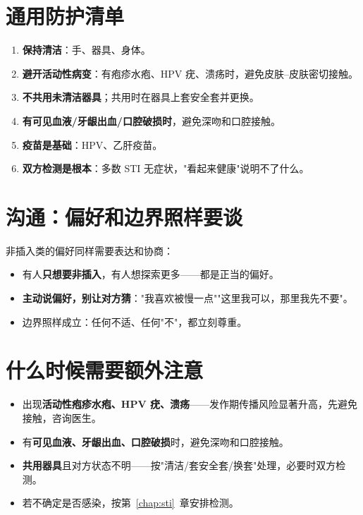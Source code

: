 \documentclass[12pt,UTF8,openany]{ctexbook}
\begin{document}
\section{通用防护清单}

\begin{enumerate}[leftmargin=2em,itemsep=0.3em]
  \item \textbf{保持清洁}：手、器具、身体。
  \item \textbf{避开活动性病变}：有疱疹水疱、HPV 疣、溃疡时，避免皮肤--皮肤密切接触。
  \item \textbf{不共用未清洁器具}；共用时在器具上套安全套并更换。
  \item \textbf{有可见血液/牙龈出血/口腔破损时}，避免深吻和口腔接触。
  \item \textbf{疫苗是基础}：HPV、乙肝疫苗。
  \item \textbf{双方检测是根本}：多数 STI 无症状，"看起来健康"说明不了什么。
\end{enumerate}

\section{沟通：偏好和边界照样要谈}

非插入类的偏好同样需要表达和协商：

\begin{itemize}[leftmargin=2em]
  \item 有人\textbf{只想要非插入}，有人想探索更多——都是正当的偏好。
  \item \textbf{主动说偏好，别让对方猜}："我喜欢被慢一点""这里我可以，那里我先不要"。
  \item 边界照样成立：任何不适、任何"不"，都立刻尊重。
\end{itemize}

\section{什么时候需要额外注意}

\begin{itemize}[leftmargin=2em]
  \item 出现\textbf{活动性疱疹水疱、HPV 疣、溃疡}——发作期传播风险显著升高，先避免接触，咨询医生。
  \item 有\textbf{可见血液、牙龈出血、口腔破损}时，避免深吻和口腔接触。
  \item \textbf{共用器具}且对方状态不明——按"清洁/套安全套/换套"处理，必要时双方检测。
  \item 若不确定是否感染，按第~\ref{chap:sti}~章安排检测。
\end{itemize}
\end{document}
